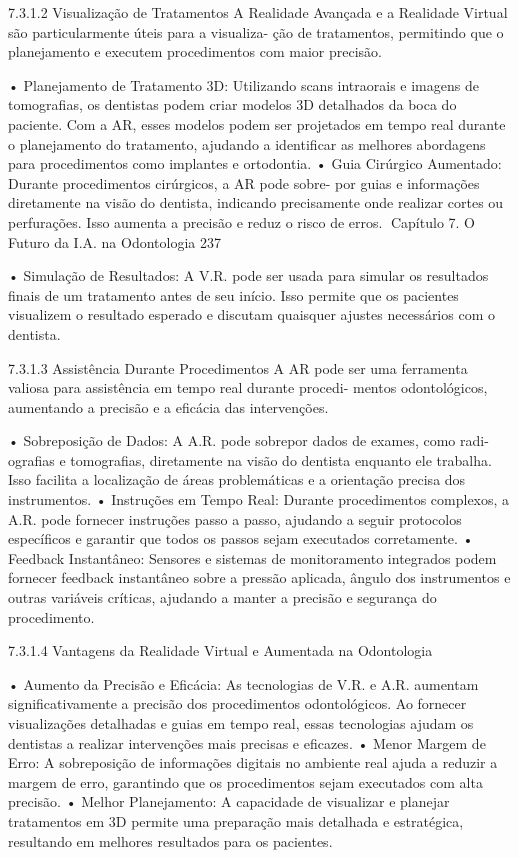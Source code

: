 7.3.1.2   Visualização de Tratamentos
A Realidade Avançada e a Realidade Virtual são particularmente úteis para a visualiza-
ção de tratamentos, permitindo que o planejamento e executem procedimentos com
maior precisão.

    • Planejamento de Tratamento 3D: Utilizando scans intraorais e imagens de
      tomografias, os dentistas podem criar modelos 3D detalhados da boca do paciente.
      Com a AR, esses modelos podem ser projetados em tempo real durante o
      planejamento do tratamento, ajudando a identificar as melhores abordagens para
      procedimentos como implantes e ortodontia.
    • Guia Cirúrgico Aumentado: Durante procedimentos cirúrgicos, a AR pode sobre-
      por guias e informações diretamente na visão do dentista, indicando precisamente
      onde realizar cortes ou perfurações. Isso aumenta a precisão e reduz o risco de
      erros.
Capítulo 7. O Futuro da I.A. na Odontologia                                         237


    • Simulação de Resultados: A V.R. pode ser usada para simular os resultados
      finais de um tratamento antes de seu início. Isso permite que os pacientes
      visualizem o resultado esperado e discutam quaisquer ajustes necessários com o
      dentista.

7.3.1.3   Assistência Durante Procedimentos
A AR pode ser uma ferramenta valiosa para assistência em tempo real durante procedi-
mentos odontológicos, aumentando a precisão e a eficácia das intervenções.

    • Sobreposição de Dados: A A.R. pode sobrepor dados de exames, como radi-
      ografias e tomografias, diretamente na visão do dentista enquanto ele trabalha.
      Isso facilita a localização de áreas problemáticas e a orientação precisa dos
      instrumentos.
    • Instruções em Tempo Real: Durante procedimentos complexos, a A.R. pode
      fornecer instruções passo a passo, ajudando a seguir protocolos específicos e
      garantir que todos os passos sejam executados corretamente.
    • Feedback Instantâneo: Sensores e sistemas de monitoramento integrados
      podem fornecer feedback instantâneo sobre a pressão aplicada, ângulo dos
      instrumentos e outras variáveis críticas, ajudando a manter a precisão e segurança
      do procedimento.

7.3.1.4   Vantagens da Realidade Virtual e Aumentada na Odontologia

    • Aumento da Precisão e Eficácia: As tecnologias de V.R. e A.R. aumentam
      significativamente a precisão dos procedimentos odontológicos. Ao fornecer
      visualizações detalhadas e guias em tempo real, essas tecnologias ajudam os
      dentistas a realizar intervenções mais precisas e eficazes.
    • Menor Margem de Erro: A sobreposição de informações digitais no ambiente
      real ajuda a reduzir a margem de erro, garantindo que os procedimentos sejam
      executados com alta precisão.
    • Melhor Planejamento: A capacidade de visualizar e planejar tratamentos em 3D
      permite uma preparação mais detalhada e estratégica, resultando em melhores
      resultados para os pacientes.

